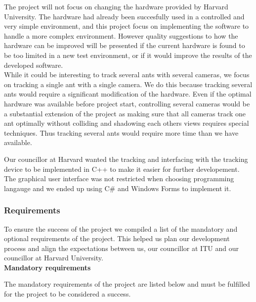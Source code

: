 The project will not focus on changing the hardware provided by Harvard University. The hardware had already been succesfully used in a controlled and very simple environment, and this project focus on implementing the software to handle a more complex environment. However quality suggestions to how the hardware can be improved will be presented if the current hardware is found to be too limited in a new test environment, or if it would improve the results of the developed software.\\

While it could be interesting to track several ants with several cameras, we focus on tracking a single ant with a single camera. We do this because tracking several ants would require a significant modification of the hardware. Even if the optimal hardware was available before project start, controlling several cameras would be a substantial extension of the project as making sure that all cameras track one ant optimally without colliding and shadowing each others views requires special techniques. Thus tracking several ants would require more time than we have available.

Our councillor at Harvard wanted the tracking and interfacing with the tracking device to be implemented in C++ to make it easier for further developement. The graphical user interface was not restricted when choosing programming langauge and we ended up using C\# and Windows Forms to implement it.

\subsubsection{Requirements} \mbox{}\par
\label{requirements}

To ensure the success of the project we compiled a list of the mandatory and optional requirements of the project. This helped us plan our development process and align the expectations between us, our councillor at ITU and our councillor at Harvard University. \\

\noindent \textbf{Mandatory requirements} \par
The mandatory requirements of the project are listed below and must be fulfilled for the project to be considered a success.

